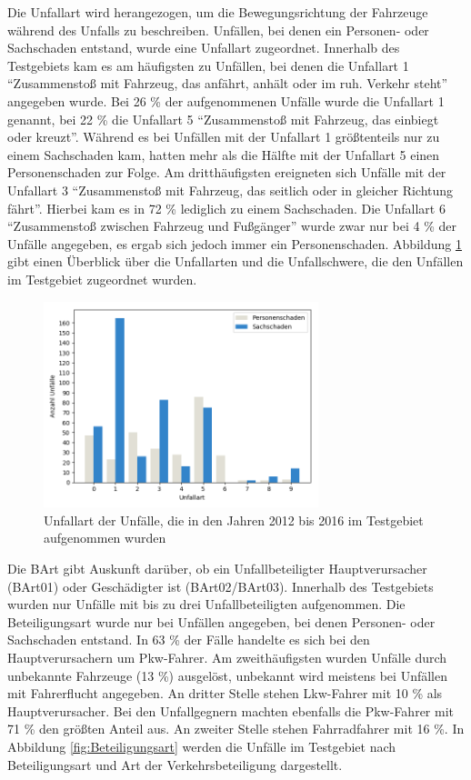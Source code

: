 Die Unfallart wird herangezogen, um die Bewegungsrichtung der Fahrzeuge während des Unfalls zu beschreiben. Unfällen, bei denen ein Personen- oder Sachschaden entstand, wurde eine Unfallart zugeordnet. Innerhalb des Testgebiets kam es am häufigsten zu Unfällen, bei denen die Unfallart 1 \enquote{Zusammenstoß mit Fahrzeug, das anfährt, anhält oder im ruh. Verkehr steht} angegeben wurde. Bei 26 \% der aufgenommenen Unfälle wurde die Unfallart 1 genannt, bei 22 \% die Unfallart 5 \enquote{Zusammenstoß mit Fahrzeug, das einbiegt oder kreuzt}. Während es bei Unfällen mit der Unfallart 1 größtenteils nur zu einem Sachschaden kam, hatten mehr als die Hälfte mit der Unfallart 5 einen Personenschaden zur Folge. Am dritthäufigsten ereigneten sich Unfälle mit der Unfallart 3 \enquote{Zusammenstoß mit Fahrzeug, das seitlich oder in gleicher Richtung fährt}. Hierbei kam es in 72 \% lediglich zu einem Sachschaden. Die Unfallart 6 \enquote{Zusammenstoß zwischen Fahrzeug und Fußgänger} wurde zwar nur bei 4 \% der Unfälle angegeben, es ergab sich jedoch immer ein Personenschaden. Abbildung \ref{fig:Unfallart} gibt einen Überblick über die Unfallarten und die Unfallschwere, die den Unfällen im Testgebiet zugeordnet wurden.

\begin{savenotes}
	\begin{figure}[H]
		\centering
		\includegraphics[width=8cm,height=6cm]{figures/Unfallart}
		\caption[Unfallart der Unfälle, die in den Jahren 2012 bis 2016 im Testgebiet aufgenommen wurden]{Unfallart der Unfälle, die in den Jahren 2012 bis 2016 im Testgebiet aufgenommen wurden}\label{fig:Unfallart}
	\end{figure}
\end{savenotes}

Die \ac{BArt} gibt Auskunft darüber, ob ein Unfallbeteiligter Hauptverursacher (BArt01) oder Geschädigter ist (BArt02/BArt03). Innerhalb des Testgebiets wurden nur Unfälle mit bis zu drei Unfallbeteiligten aufgenommen. Die Beteiligungsart wurde nur bei Unfällen angegeben, bei denen Personen- oder Sachschaden entstand. In 63 \% der Fälle handelte es sich bei den Hauptverursachern um Pkw-Fahrer. Am zweithäufigsten wurden Unfälle durch unbekannte Fahrzeuge (13 \%) ausgelöst, unbekannt wird meistens bei Unfällen mit Fahrerflucht angegeben. An dritter Stelle stehen Lkw-Fahrer mit 10 \% als Hauptverursacher. Bei den Unfallgegnern machten ebenfalls die Pkw-Fahrer mit 71 \% den größten Anteil aus. An zweiter Stelle stehen Fahrradfahrer mit 16 \%. In Abbildung \ref{fig:Beteiligungsart} werden die Unfälle im Testgebiet nach Beteiligungsart und Art der Verkehrsbeteiligung dargestellt. 

